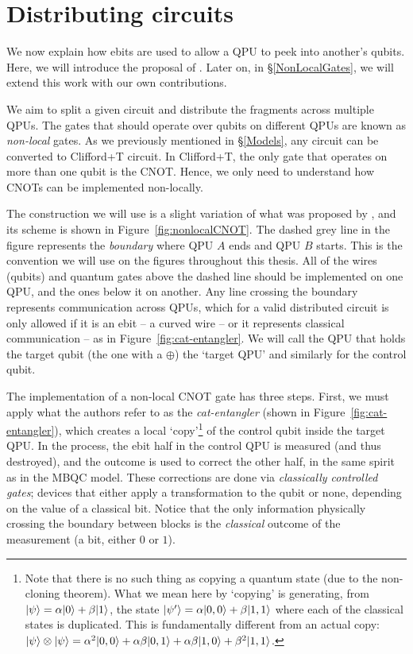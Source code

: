\section{Distributing circuits}
\label{IntroDistributing}

We now explain how ebits are used to allow a QPU to peek into another's qubits. Here, we will introduce the proposal of \citet{NonLocalCNOT}. Later on, in \S\ref{NonLocalGates}, we will extend this work with our own contributions. 

We aim to split a given circuit and distribute the fragments across multiple QPUs. The gates that should operate over qubits on different QPUs are known as \textit{non-local} gates. As we previously mentioned in \S\ref{Models}, any circuit can be converted to Clifford+T circuit. In Clifford+T, the only gate that operates on more than one qubit is the CNOT. Hence, we only need to understand how CNOTs can be implemented non-locally.

The construction we will use is a slight variation of what was proposed by \citet{NonLocalCNOT}, and its scheme is shown in Figure~\ref{fig:nonlocalCNOT}. The dashed grey line in the figure represents the \textit{boundary} where QPU \(A\) ends and QPU \(B\) starts. This is the convention we will use on the figures throughout this thesis. All of the wires (qubits) and quantum gates above the dashed line should be implemented on one QPU, and the ones below it on another. Any line crossing the boundary represents communication across QPUs, which for a valid distributed circuit is only allowed if it is an ebit -- a curved wire -- or it represents classical communication -- as in Figure~\ref{fig:cat-entangler}. We will call the QPU that holds the target qubit (the one with a \(\oplus\)) the `target QPU' and similarly for the control qubit. 



The implementation of a non-local CNOT gate has three steps. First, we must apply what the authors refer to as the \textit{cat-entangler} (shown in Figure~\ref{fig:cat-entangler}), which creates a local `copy'\footnote{Note that there is no such thing as copying a quantum state (due to the non-cloning theorem). What we mean here by `copying' is generating, from \(\vert \psi \rangle = \alpha\vert 0 \rangle + \beta\vert 1 \rangle\), the state \(\vert \psi' \rangle = \alpha\vert 0,0 \rangle + \beta\vert 1,1 \rangle\) where each of the classical states is duplicated. This is fundamentally different from an actual copy: \(\vert \psi \rangle\otimes\vert \psi \rangle = \alpha^2\vert 0,0 \rangle + \alpha\beta\vert 0,1 \rangle + \alpha\beta\vert 1,0 \rangle + \beta^2\vert 1,1 \rangle\).} of the control qubit inside the target QPU. In the process, the ebit half in the control QPU is measured (and thus destroyed), and the outcome is used to correct the other half, in the same spirit as in the MBQC model. These corrections are done via \textit{classically controlled gates}; devices that either apply a transformation to the qubit or none, depending on the value of a classical bit. Notice that the only information physically crossing the boundary between blocks is the \textit{classical} outcome of the measurement (a bit, either \(0\) or \(1\)).

